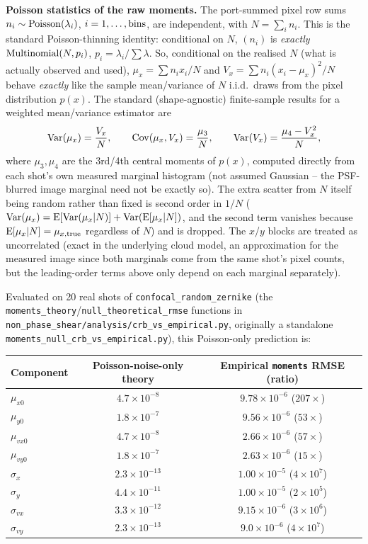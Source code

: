 \documentclass[11pt,a4paper]{article}
\newcommand{\code}[1]{\texttt{#1}}
\begin{document}
\textbf{Poisson statistics of the raw moments.} The port-summed pixel row
sums $n_i\sim{\rm Poisson}(\lambda_i)$, $i=1,\dots,{\rm bins}$, are
independent, with $N=\sum_i n_i$. This is the standard Poisson-thinning
identity: conditional on $N$, $(n_i)$ is \emph{exactly}
${\rm Multinomial}(N, p_i)$, $p_i=\lambda_i/\sum\lambda$. So, conditional on
the realised $N$ (what is actually observed and used), $\mu_x=\sum n_ix_i/N$
and $V_x=\sum n_i(x_i-\mu_x)^2/N$ behave \emph{exactly} like the sample
mean/variance of $N$ i.i.d.\ draws from the pixel distribution $p(x)$. The
standard (shape-agnostic) finite-sample results for a weighted
mean/variance estimator are
\[
  {\rm Var}(\mu_x) = \frac{V_x}{N},\qquad
  {\rm Cov}(\mu_x,V_x) = \frac{\mu_3}{N},\qquad
  {\rm Var}(V_x) = \frac{\mu_4-V_x^2}{N},
\]
where $\mu_3,\mu_4$ are the 3rd/4th central moments of $p(x)$, computed
directly from each shot's own measured marginal histogram (not assumed
Gaussian -- the PSF-blurred image marginal need not be exactly so). The
extra scatter from $N$ itself being random rather than fixed is second order
in $1/N$ (${\rm Var}(\mu_x)={\rm E}[{\rm Var}(\mu_x|N)]+{\rm Var}({\rm
E}[\mu_x|N])$, and the second term vanishes because ${\rm E}[\mu_x|N]=\mu_{x,{\rm true}}$
regardless of $N$) and is dropped. The $x$/$y$ blocks are treated as
uncorrelated (exact in the underlying cloud model, an approximation for the
measured image since both marginals come from the same shot's pixel counts,
but the leading-order terms above only depend on each marginal separately).

Evaluated on 20 real shots of \code{confocal\_random\_zernike}
(the \code{moments\_theory}/\code{null\_theoretical\_rmse} functions in
\code{non\_phase\_shear/analysis/crb\_vs\_empirical.py}, originally a
standalone \code{moments\_null\_crb\_vs\_empirical.py}), this Poisson-only
prediction is:
\begin{center}\small
\begin{tabular}{lcc}
\toprule
Component & Poisson-noise-only theory & Empirical \code{moments} RMSE (ratio) \\
\midrule
$\mu_{x0}$    & $4.7\times10^{-8}$  & $9.78\times10^{-6}$ ($207\times$) \\
$\mu_{y0}$    & $1.8\times10^{-7}$  & $9.56\times10^{-6}$ ($53\times$) \\
$\mu_{vx0}$   & $4.7\times10^{-8}$  & $2.66\times10^{-6}$ ($57\times$) \\
$\mu_{vy0}$   & $1.8\times10^{-7}$  & $2.63\times10^{-6}$ ($15\times$) \\
$\sigma_x$    & $2.3\times10^{-13}$ & $1.00\times10^{-5}$ ($4\times10^7$) \\
$\sigma_y$    & $4.4\times10^{-11}$ & $1.00\times10^{-5}$ ($2\times10^5$) \\
$\sigma_{vx}$ & $3.3\times10^{-12}$ & $9.15\times10^{-6}$ ($3\times10^6$) \\
$\sigma_{vy}$ & $2.3\times10^{-13}$ & $9.0\times10^{-6}$ ($4\times10^7$) \\
\bottomrule
\end{tabular}
\end{center}
\end{document}

